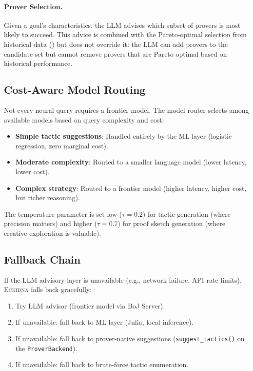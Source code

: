 \documentclass[11pt,a4paper]{article}
\newcommand{\echidna}{\textsc{Echidna}}
\newcommand{\proverbackend}{\texttt{ProverBackend}}
\begin{document}
\paragraph{Prover Selection.}
Given a goal's characteristics, the LLM advises which subset of provers is
most likely to succeed. This advice is combined with the Pareto-optimal
selection from historical data () but does not override
it: the LLM can add provers to the candidate set but cannot remove provers
that are Pareto-optimal based on historical performance.

\subsection{Cost-Aware Model Routing}

Not every neural query requires a frontier model. The model router selects
among available models based on query complexity and cost:

\begin{itemize}
  \item \textbf{Simple tactic suggestions}: Handled entirely by the ML layer
  (logistic regression, zero marginal cost).
  \item \textbf{Moderate complexity}: Routed to a smaller language model
  (lower latency, lower cost).
  \item \textbf{Complex strategy}: Routed to a frontier model (higher latency,
  higher cost, but richer reasoning).
\end{itemize}

The temperature parameter is set low ($\tau = 0.2$) for tactic generation
(where precision matters) and higher ($\tau = 0.7$) for proof sketch
generation (where creative exploration is valuable).

\subsection{Fallback Chain}

If the LLM advisory layer is unavailable (e.g., network failure, API rate
limits), \echidna{} falls back gracefully:

\begin{enumerate}
  \item Try LLM advisor (frontier model via BoJ Server).
  \item If unavailable: fall back to ML layer (Julia, local inference).
  \item If unavailable: fall back to prover-native suggestions
  (\texttt{suggest\_tactics()} on the \proverbackend{}).
  \item If unavailable: fall back to brute-force tactic enumeration.
\end{enumerate}
\end{document}
